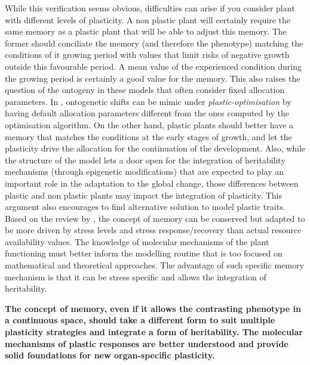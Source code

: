 While this verification seems obvious, difficulties can arise if you consider plant with different levels of plasticity. A non plastic plant will certainly require the same memory as a plastic plant that will be able to adjust this memory. The former should conciliate the memory (and therefore the phenotype) matching the conditions of it growing period with values that limit risks of negative growth outside this favourable period. A mean value of the experienced condition during the growing period is certainly a good value for the memory. This also raises the question of the ontogeny in these models that often consider fixed allocation parameters. In \model, ontogenetic shifts can be mimic under \textit{plastic-optimisation} by having default allocation parameters different from the ones computed by the optimisation algorithm. On the other hand, plastic plants should better have a memory that matches the conditions at the early stages of growth, and let the plasticity drive the allocation for the continuation of the development. Also, while the structure of the model lets a door open for the integration of heritability mechanisms (through epigenetic modifications) that are expected to play an important role in the adaptation to the global change, those differences between plastic and non plastic plants may impact the integration of plasticity. This argument also encourages to find alternative solution to model plastic traits. Based on the review by \citet{crisp_reconsidering_2016}, the concept of memory can be conserved but adapted to be more driven by stress levels and stress response/recovery than actual resource availability values. The knowledge of molecular mechanisms of the plant functioning must better inform the modelling routine that is too focused on mathematical and theoretical approaches. The advantage of such specific memory mechanism is that it can be stress specific  and allows the integration of heritability.

\textbf{The concept of memory, even if it allows the contrasting phenotype in a continuous space, should take a different form to suit multiple plasticity strategies and integrate a form of heritability. The molecular mechanisms of plastic responses are better understood and provide solid foundations for new organ-specific plasticity.}

